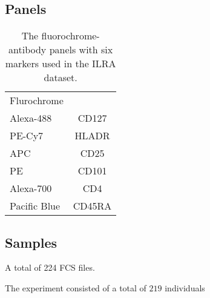 

\subsection{Panels}

\begin{table}[h!]\footnotesize
\begin{tabularx}{\textwidth}{lc}
\rowcolor{Gray}
Flurochrome  & \\
Alexa-488    & CD127\\
PE-Cy7       & HLADR\\
APC          & CD25\\
PE           & CD101\\
Alexa-700    & CD4\\
Pacific Blue & CD45RA\\
\end{tabularx}
\caption{ \label{IL2RA-panels}
The fluorochrome-antibody panels with six markers used in the ILRA dataset.
}
\end{table}



%



\subsection{Samples}

A total of 224 FCS files.


The experiment consisted of a total of $219$ individuals

